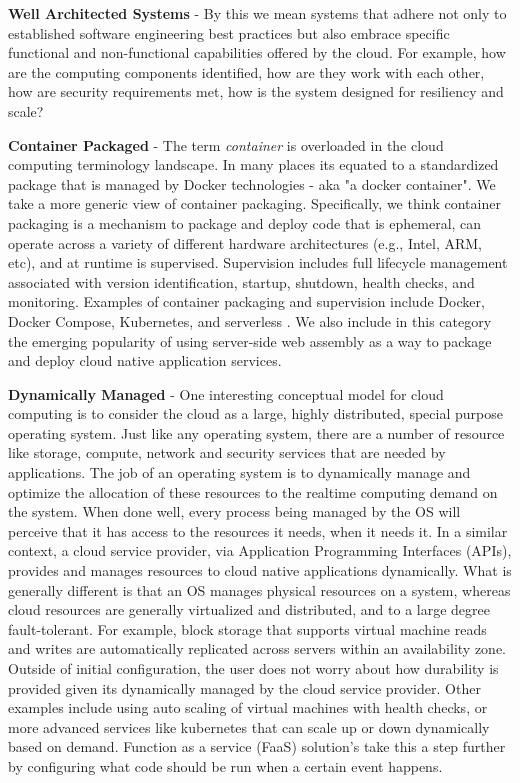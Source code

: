 \documentclass[conference]{IEEEconf}
\begin{document}
\textbf{Well Architected Systems} - By this we mean systems that adhere not only to established software engineering best practices but also embrace specific functional and non-functional capabilities offered by the cloud. For example, how are the computing components identified, how are they work with each other, how are security requirements met, how is the system designed for resiliency and scale?

\textbf{Container Packaged} - The term \textit{container} is overloaded in the cloud computing terminology landscape.  In many places its equated to a standardized package that is managed by Docker\cite{DockerContainer} technologies - aka "a docker container".  We take a more generic view of container packaging. Specifically, we think container packaging is a mechanism to package and deploy code that is ephemeral, can operate across a variety of different hardware architectures (e.g., Intel, ARM, etc), and at runtime is supervised.  Supervision includes full lifecycle management associated with version identification, startup, shutdown, health checks, and monitoring.  Examples of container packaging and supervision include Docker, Docker Compose, Kubernetes, and serverless \cite{baldini2017serverless}. We also include in this category the emerging popularity of using server-side web assembly\cite{haas2017bringing, bosshard2020use} as a way to package and deploy cloud native application services. 

\textbf{Dynamically Managed} - One interesting conceptual model for cloud computing is to consider the cloud as a large, highly distributed, special purpose operating system. Just like any operating system, there are a number of resource like storage, compute, network and security services that are needed by applications.  The job of an operating system is to dynamically manage and optimize the allocation of these resources to the realtime computing demand on the system.  When done well, every process being managed by the OS will perceive that it has access to the resources it needs, when it needs it.  In a similar context, a cloud service provider, via Application Programming Interfaces (APIs), provides and manages resources to cloud native applications dynamically. What is generally different is that an OS manages physical resources on a system, whereas cloud resources are generally virtualized and distributed, and to a large degree fault-tolerant.  For example, block storage that supports virtual machine reads and writes are automatically replicated across servers within an availability zone. Outside of initial configuration, the user does not worry about how durability is provided given its dynamically managed by the cloud service provider. Other examples include using auto scaling of virtual machines with health checks, or more advanced services like kubernetes\cite{kubernetes} that can scale up or down dynamically based on demand. Function as a service (FaaS) solution's take this a step further by configuring what code should be run when a certain event happens.     
\end{document}
